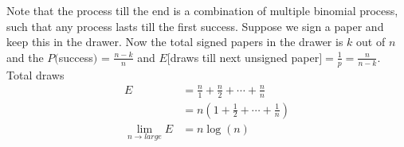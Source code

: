 \documentclass[../../probability-notes.tex]{subfiles}
\begin{document}
Note that the process till the end is a combination of multiple binomial process, such that any process lasts till the first success. Suppose we sign a paper and keep this in the drawer. Now the total signed papers in the drawer is $k$ out of $n$ and the $P($success$)$ = $\frac{n-k}{n}$ and $E[$draws till next unsigned paper$] = \frac{1}{p} = \frac{n}{n-k}$. Total draws
        \begin{align*}
            E &= \frac{n}{1} + \frac{n}{2} + \cdots + \frac{n}{n}\\
             &= n(1 + \frac{1}{2} + \cdots + \frac{1}{n})\\
            \lim_{n \to large} E &= n \log(n) 
        \end{align*}
\end{document}
